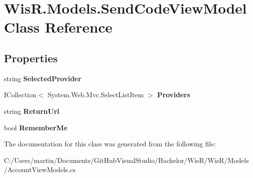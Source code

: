 \hypertarget{class_wis_r_1_1_models_1_1_send_code_view_model}{}\section{Wis\+R.\+Models.\+Send\+Code\+View\+Model Class Reference}
\label{class_wis_r_1_1_models_1_1_send_code_view_model}
\subsection*{Properties}
\begin{DoxyCompactItemize}
\item 
\hypertarget{class_wis_r_1_1_models_1_1_send_code_view_model_ae772ec9fabc26d8effd755eceb8bd618}{}string {\bfseries Selected\+Provider}\label{class_wis_r_1_1_models_1_1_send_code_view_model_ae772ec9fabc26d8effd755eceb8bd618}

\item 
\hypertarget{class_wis_r_1_1_models_1_1_send_code_view_model_a4986c493d16e16a53b0cd355c30cee6d}{}I\+Collection$<$ System.\+Web.\+Mvc.\+Select\+List\+Item $>$ {\bfseries Providers}\label{class_wis_r_1_1_models_1_1_send_code_view_model_a4986c493d16e16a53b0cd355c30cee6d}

\item 
\hypertarget{class_wis_r_1_1_models_1_1_send_code_view_model_a26a03dcdbde4062270689942a2d0d820}{}string {\bfseries Return\+Url}\label{class_wis_r_1_1_models_1_1_send_code_view_model_a26a03dcdbde4062270689942a2d0d820}

\item 
\hypertarget{class_wis_r_1_1_models_1_1_send_code_view_model_a10714bd95e8350a1bbd2f1e55e643350}{}bool {\bfseries Remember\+Me}\label{class_wis_r_1_1_models_1_1_send_code_view_model_a10714bd95e8350a1bbd2f1e55e643350}

\end{DoxyCompactItemize}


The documentation for this class was generated from the following file\+:\begin{DoxyCompactItemize}
\item 
C\+:/\+Users/martin/\+Documents/\+Git\+Hub\+Visual\+Studio/\+Bachelor/\+Wis\+R/\+Wis\+R/\+Models/Account\+View\+Models.\+cs\end{DoxyCompactItemize}
